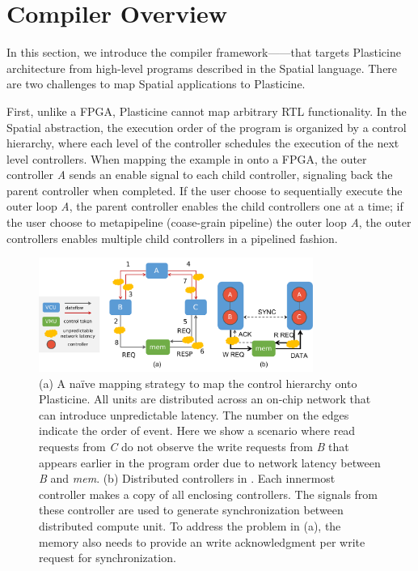 \section{\name Compiler Overview} \label{sec:compileroverview}

In this section, we introduce the compiler framework---\name---that targets Plasticine
architecture from high-level programs described in the Spatial language. 
There are two challenges to map Spatial applications to Plasticine. 

First, unlike a FPGA, Plasticine cannot map arbitrary RTL functionality.
In the Spatial abstraction, the execution order of the program is organized by a control hierarchy, where
each level of the controller schedules the execution of the next level controllers.
When mapping the example in  onto a FPGA, the outer controller \emph{A}
sends an enable signal to each child controller, signaling back the parent controller when
completed. If the user choose to sequentially execute the outer loop \emph{A}, the parent
controller enables the child controllers one at a time; if the user choose to metapipeline
(coase-grain pipeline) the outer loop \emph{A}, the outer controllers enables multiple child
controllers in a pipelined fashion.

\begin{figure}
\centering
  \centering
\includegraphics[width=0.8\textwidth]{figs/centralctrl.pdf}
\caption{
  (a) A na\"ive mapping strategy to map the control hierarchy onto Plasticine.
  All units are distributed across an on-chip network that can introduce unpredictable latency.
  The number on the edges indicate the order of event.
  Here we show a scenario where read requests from \emph{C} do not observe the write requests from
  \emph{B} that appears earlier in the program order due to network latency between \emph{B} and
  \emph{mem}.
  (b) Distributed controllers in \name. Each innermost controller makes a copy of all enclosing
  controllers. The signals from these controller are used to generate synchronization between
  distributed compute unit. To address the problem in (a), the memory also needs to provide an write
  acknowledgment per write request for synchronization.
}
\label{fig:centralctrl}
\end{figure}

